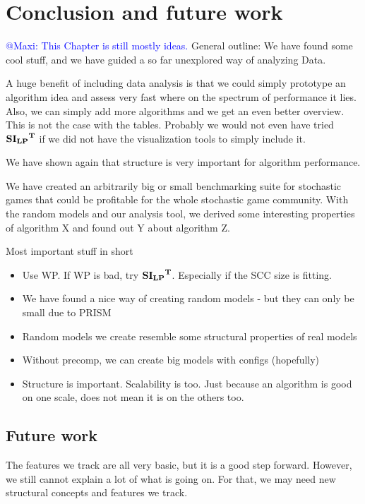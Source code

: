 \chapter{Conclusion and future work} \label{ch:conclusion}
\textcolor{blue}{@Maxi: This Chapter is still mostly ideas.}
General outline: We have found some cool stuff, and we have guided a so far unexplored way of analyzing Data.

A huge benefit of including data analysis is that we could simply prototype an algorithm idea and assess very fast where on the spectrum of performance it lies.
Also, we can simply add more algorithms and we get an even better overview. This is not the case with the tables.
Probably we would not even have tried $\mathbf{\mathbf{SI_{LP}}^T}$ if we did not have the visualization tools to simply include it.

We have shown again that structure is very important for algorithm performance.

We have created an arbitrarily big or small benchmarking suite for stochastic games that could be profitable for the whole stochastic game community.
With the random models and our analysis tool, we derived some interesting properties of algorithm X and found out Y about algorithm Z.


Most important stuff in short
\begin{itemize}
    \item Use WP. If WP is bad, try $\mathbf{\mathbf{SI_{LP}}^T}$. Especially if the SCC size is fitting.
    \item We have found a nice way of creating random models - but they can only be small due to PRISM
    \item Random models we create resemble some structural properties of real models
    \item Without precomp, we can create big models with configs (hopefully)
    \item Structure is important. Scalability is too. Just because an algorithm is good on one scale, does not mean it is on the others too.
\end{itemize}

\section*{Future work}
The features we track are all very basic, but it is a good step forward. However, we still cannot explain a lot of what is going on.
For that, we may need new structural concepts and features we track.

